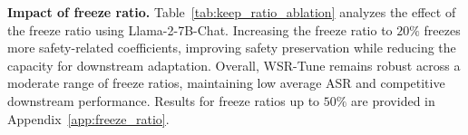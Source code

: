 \documentclass{article}
\newcommand{\djh}[1]{{\leavevmode\color{magenta}[DJ: #1]}}
\begin{document}
\begin{table}
\vspace{-3mm}
\centering
\scriptsize
\caption{Effect of the freeze ratio in WSR-Tune.}
\label{tab:keep_ratio_ablation}
\vspace{-2mm}
\renewcommand{\arraystretch}{0.85}
\setlength{\tabcolsep}{3pt}

\end{table}


\textbf{Impact of freeze ratio.} %
Table~\ref{tab:keep_ratio_ablation} analyzes the effect of the freeze ratio using Llama-2-7B-Chat. Increasing the freeze ratio to $20\%$ freezes more safety-related coefficients,  improving safety preservation while reducing the capacity for downstream adaptation. Overall, WSR-Tune remains robust across a moderate range of freeze ratios, maintaining low average ASR and competitive downstream performance. Results for freeze ratios up to $50\%$ are provided in Appendix~\ref{app:freeze_ratio}.
\end{document}
